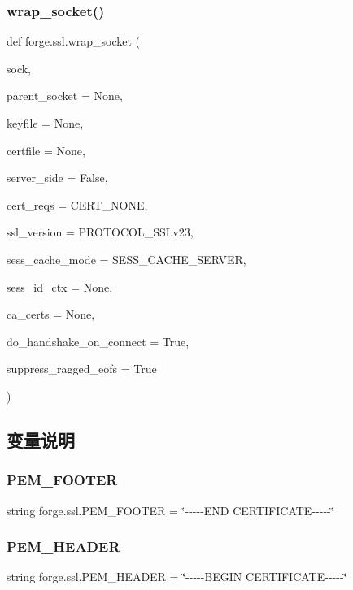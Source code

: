 \subsubsection{\texorpdfstring{wrap\+\_\+socket()}{wrap\_socket()}}
{\footnotesize\ttfamily def forge.\+ssl.\+wrap\+\_\+socket (\begin{DoxyParamCaption}\item[{}]{sock,  }\item[{}]{parent\+\_\+socket = {\ttfamily None},  }\item[{}]{keyfile = {\ttfamily None},  }\item[{}]{certfile = {\ttfamily None},  }\item[{}]{server\+\_\+side = {\ttfamily False},  }\item[{}]{cert\+\_\+reqs = {\ttfamily CERT\+\_\+NONE},  }\item[{}]{ssl\+\_\+version = {\ttfamily PROTOCOL\+\_\+SSLv23},  }\item[{}]{sess\+\_\+cache\+\_\+mode = {\ttfamily SESS\+\_\+CACHE\+\_\+SERVER},  }\item[{}]{sess\+\_\+id\+\_\+ctx = {\ttfamily None},  }\item[{}]{ca\+\_\+certs = {\ttfamily None},  }\item[{}]{do\+\_\+handshake\+\_\+on\+\_\+connect = {\ttfamily True},  }\item[{}]{suppress\+\_\+ragged\+\_\+eofs = {\ttfamily True} }\end{DoxyParamCaption})}



\subsection{变量说明}
\mbox{\label{namespaceforge_1_1ssl_a5ead7d8786c1664f8868104113740ba9}} 
\subsubsection{\texorpdfstring{P\+E\+M\+\_\+\+F\+O\+O\+T\+ER}{PEM\_FOOTER}}
{\footnotesize\ttfamily string forge.\+ssl.\+P\+E\+M\+\_\+\+F\+O\+O\+T\+ER = \char`\"{}-\/-\/-\/-\/-\/E\+ND C\+E\+R\+T\+I\+F\+I\+C\+A\+TE-\/-\/-\/-\/-\/\char`\"{}}

\mbox{\label{namespaceforge_1_1ssl_a99dffc73bf2c64e8d1c46dac181f8ddf}} 
\subsubsection{\texorpdfstring{P\+E\+M\+\_\+\+H\+E\+A\+D\+ER}{PEM\_HEADER}}
{\footnotesize\ttfamily string forge.\+ssl.\+P\+E\+M\+\_\+\+H\+E\+A\+D\+ER = \char`\"{}-\/-\/-\/-\/-\/B\+E\+G\+IN C\+E\+R\+T\+I\+F\+I\+C\+A\+TE-\/-\/-\/-\/-\/\char`\"{}}

